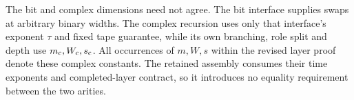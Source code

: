 The bit and complex dimensions need not agree. The bit interface supplies
swaps at arbitrary binary widths. The complex recursion uses only that
interface's exponent $\tau$ and fixed tape guarantee, while its own branching,
role split and depth use $m_{\rm c},W_{\rm c},s_{\rm c}$. All occurrences of
$m,W,s$ within the revised layer proof denote these complex constants.
The retained assembly consumes their time exponents and completed-layer
contract, so it introduces no equality requirement between the two arities.
